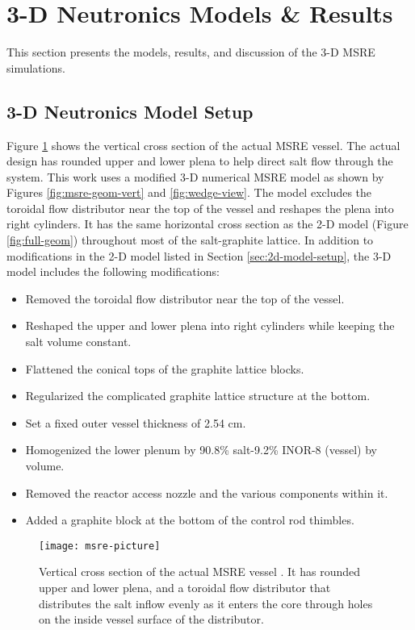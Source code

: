 \section{3-D Neutronics Models \& Results} \label{sec:3d-results}

This section presents the models, results, and discussion of the 3-D \gls{MSRE} simulations.

\subsection{3-D Neutronics Model Setup} \label{sec:3d-model-setup}

Figure \ref{fig:msre-picture} shows the vertical cross section of the actual \gls{MSRE} vessel.
The actual design has rounded upper and lower plena to help direct salt flow through the system.
This work uses a modified 3-D numerical \gls{MSRE} model as shown by Figures
\ref{fig:msre-geom-vert} and \ref{fig:wedge-view}. The model excludes the toroidal flow distributor
near the top
of the vessel and reshapes the plena into right cylinders. It has the same horizontal cross section
as the 2-D model (Figure \ref{fig:full-geom}) throughout most of the salt-graphite lattice. In
addition to modifications in the 2-D model listed in Section \ref{sec:2d-model-setup}, the
3-D model includes the following modifications:

\begin{itemize}
  \item Removed the toroidal flow distributor near the top of the vessel.
  \item Reshaped the upper and lower plena into right cylinders while keeping the salt volume
    constant.
  \item Flattened the conical tops of the graphite lattice blocks.
  \item Regularized the complicated graphite lattice structure at the bottom.
  \item Set a fixed outer vessel thickness of 2.54 cm.
  \item Homogenized the lower plenum by 90.8\% salt-9.2\% INOR-8 (vessel) by volume.
  \item Removed the reactor access nozzle and the various components within it.
  \item Added a graphite block at the bottom of the control rod thimbles.
\end{itemize}

\begin{figure}[p]
  \centering
  \texttt{[image: msre-picture]}
  \caption{Vertical cross section of the actual \gls{MSRE} vessel \cite{robertson_msre_1965}.
  It has rounded upper and lower
  plena, and a toroidal flow distributor that distributes the salt inflow evenly as it enters the
  core through holes on the inside vessel surface of the distributor.}
  \label{fig:msre-picture}
\end{figure}

